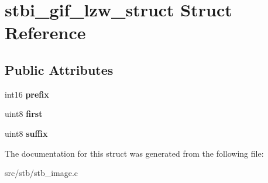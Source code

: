 \hypertarget{structstbi__gif__lzw__struct}{}\section{stbi\+\_\+gif\+\_\+lzw\+\_\+struct Struct Reference}
\label{structstbi__gif__lzw__struct}
\subsection*{Public Attributes}
\begin{DoxyCompactItemize}
\item 
\mbox{\label{structstbi__gif__lzw__struct_a0e5142cb4117b905eb9efd73c436525c}} 
int16 {\bfseries prefix}
\item 
\mbox{\label{structstbi__gif__lzw__struct_a08129c445d56c0983285d6e0e71b83bd}} 
uint8 {\bfseries first}
\item 
\mbox{\label{structstbi__gif__lzw__struct_a3ec7f462268018489345b79b2f123764}} 
uint8 {\bfseries suffix}
\end{DoxyCompactItemize}


The documentation for this struct was generated from the following file\+:\begin{DoxyCompactItemize}
\item 
src/stb/stb\+\_\+image.\+c\end{DoxyCompactItemize}
